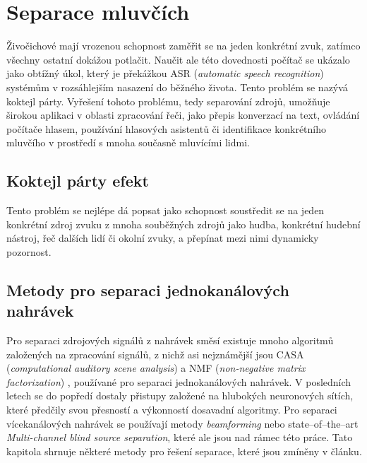 \chapter{Separace mluvčích}
\label{separace}
Živočichové mají vrozenou schopnost zaměřit se na jeden konkrétní zvuk, zatímco všechny ostatní dokážou potlačit. Naučit ale této dovednosti počítač se ukázalo jako obtížný úkol, který je překážkou ASR (\textit{automatic speech recognition}) systémům v rozsáhlejším nasazení do běžného života. Tento problém se nazývá koktejl párty. Vyřešení tohoto problému, tedy separování zdrojů, umožňuje širokou aplikaci v oblasti zpracování řeči, jako  přepis konverzací na text, ovládání počítače hlasem, používání hlasových asistentů či identifikace konkrétního mluvčího v prostředí s mnoha současně mluvícími lidmi.

\section{Koktejl párty efekt}
Tento problém se nejlépe dá popsat jako schopnost soustředit se na jeden konkrétní zdroj zvuku z mnoha souběžných zdrojů jako hudba, konkrétní hudební nástroj, řeč dalších lidí či okolní zvuky, a přepínat mezi nimi dynamicky pozornost. 



\section{Metody pro separaci jednokanálových nahrávek}
Pro separaci zdrojových signálů z nahrávek směsí existuje mnoho algoritmů založených na zpracování signálů, z nichž asi nejznámější jsou CASA (\textit{computational auditory scene analysis}) a NMF (\textit{non-negative matrix factorization}) , používané pro separaci jednokanálových nahrávek. V posledních letech se do popředí dostaly přistupy založené na hlubokých neuronových sítích, které předčily svou přesností a výkonností dosavadní algoritmy. Pro separaci vícekanálových nahrávek se používají metody \textit{beamforming} nebo state--of--the--art \textit{Multi-channel blind source separation}, které ale jsou nad rámec této práce. Tato kapitola shrnuje některé metody pro řešení separace, které jsou zmíněny v článku\cite{speechseparation}.


